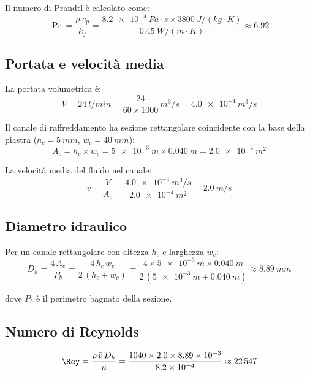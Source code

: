 \documentclass[a4paper,11pt]{article}
\begin{document}
Il numero di Prandtl è calcolato come:
\begin{equation}
  \Pr = \frac{\mu\, c_p}{k_f}
      = \frac{\SI{8.2e-4}{Pa\cdot s} \times \SI{3800}{J/(kg\cdot K)}}{\SI{0.45}{W/(m\cdot K)}}
      \approx 6.92
\end{equation}

\subsection{Portata e velocità media}

La portata volumetrica è:
\begin{equation}
  \dot{V} = \SI{24}{l/min} = \frac{24}{60\times 1000}\,\si{m^3/s}
          = \SI{4.0e-4}{m^3/s}
\end{equation}

Il canale di raffreddamento ha sezione rettangolare coincidente con la base della piastra
($h_c = \SI{5}{mm}$, $w_c = \SI{40}{mm}$):
\begin{equation}
  A_c = h_c \times w_c = \SI{5e-3}{m} \times \SI{0.040}{m} = \SI{2.0e-4}{m^2}
\end{equation}

La velocità media del fluido nel canale:
\begin{equation}
  \bar{v} = \frac{\dot{V}}{A_c} = \frac{\SI{4.0e-4}{m^3/s}}{\SI{2.0e-4}{m^2}}
          = \SI{2.0}{m/s}
\end{equation}

\subsection{Diametro idraulico}

Per un canale rettangolare con altezza $h_c$ e larghezza $w_c$:
\begin{equation}
  D_h = \frac{4\,A_c}{P_b} = \frac{4\,h_c\,w_c}{2\,(h_c+w_c)}
      = \frac{4\times\SI{5e-3}{m}\times\SI{0.040}{m}}{2\,(\SI{5e-3}{m}+\SI{0.040}{m})}
      \approx \SI{8.89}{mm}
\end{equation}

dove $P_b$ è il perimetro bagnato della sezione.

\subsection{Numero di Reynolds}

\begin{equation}
  \Rey = \frac{\rho\,\bar{v}\,D_h}{\mu}
       = \frac{1040 \times 2.0 \times \SI{8.89e-3}{}}{8.2\times10^{-4}}
       \approx 22\,547
\end{equation}
\end{document}
